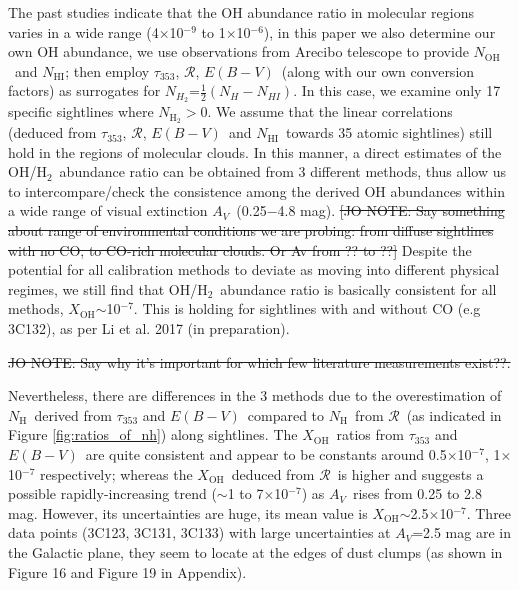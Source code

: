 \documentclass[preprint]{emulateapj}
\def\av{$A_{V}$}
\def\ebv{$E(B{-}V)$}
\def\h2{H$_2$}
\def\NHI{$N_\mathrm{HI}$}
\def\NHm{$N_{\mathrm{H}_{2}}$}
\def\NH{$N_\mathrm{H}$}
\def\NOH{$N_\mathrm{OH}$}
\def\t353{$\tau_{353}$}
\def\rad{$\mathcal{R}$}
\def\xoh{$X_\mathrm{OH}$}
\begin{document}
The past studies indicate that the OH abundance ratio in molecular regions varies in a wide range (4$\times$10$^{-9}$ to 1$\times$10$^{-6}$), in this paper we also determine our own OH abundance, we use observations from Arecibo telescope to provide \NOH\ and \NHI; then employ \t353, \rad, \ebv\ (along with our own conversion factors) as surrogates for $N_{H_{2}}$=$\frac{1}{2}(N_{H}{-}N_{HI})$. In this case, we examine only 17 specific sightlines where \NHm$>$0. We assume that the linear correlations (deduced from \t353, \rad, \ebv\ and \NHI\ towards 35 atomic sightlines) still hold in the regions of molecular clouds. In this manner, a direct estimates of the OH/\h2\ abundance ratio can be obtained from 3 different methods, thus allow us to intercompare/check the consistence among the derived OH abundances within a wide range of visual extinction \av\ (0.25$-$4.8 mag). \sout{\color{red}[JO NOTE: Say something about range of environmental conditions we are probing: from diffuse sightlines with no CO, to CO-rich molecular clouds. Or Av from ?? to ??]} Despite the potential for all calibration methods to deviate as moving into different physical regimes, we still find that OH/\h2\ abundance ratio is basically consistent for all methods, \xoh$\sim$10$^{-7}$. This is holding for sightlines with and without CO (e.g 3C132), as per Li et al. 2017 (in preparation).


\sout{JO NOTE: Say why it's important 
for which few literature measurements exist??.}

Nevertheless, there are differences in the 3 methods due to the overestimation of \NH\ derived from \t353 and \ebv\ compared to \NH\ from \rad\ (as indicated in Figure \ref{fig:ratios_of_nh}) along sightlines. The \xoh\ ratios from \t353 and \ebv\ are quite consistent and appear to be constants around 0.5$\times$10$^{-7}$, 1$\times$10$^{-7}$ respectively; whereas the \xoh\ deduced from \rad\ is higher and suggests a possible rapidly-increasing trend ($\sim$1 to 7$\times$10$^{-7}$) as \av\ rises from 0.25 to 2.8 mag. However, its uncertainties are huge, its mean value is \xoh$\sim$2.5$\times$10$^{-7}$. Three data points (3C123, 3C131, 3C133) with large uncertainties at \av=2.5 mag are in the Galactic plane, they seem to locate at the edges of dust clumps (as shown in Figure 16 and Figure 19 in Appendix).
\end{document}
